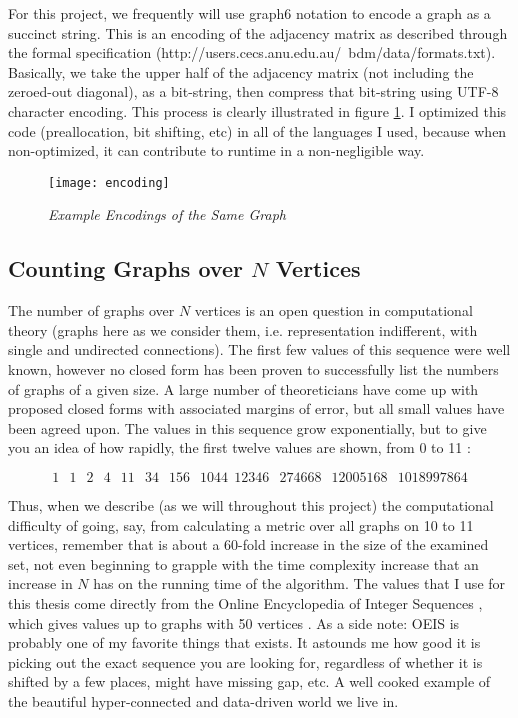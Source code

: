 For this project, we frequently will use graph6 notation to encode a graph as a succinct string.
This is an encoding of the adjacency matrix as described through the formal specification (http://users.cecs.anu.edu.au/~bdm/data/formats.txt).
Basically, we take the upper half of the adjacency matrix (not including the zeroed-out diagonal), as a bit-string, then compress that bit-string using UTF-8 character encoding.
This process is clearly illustrated in figure \ref{fig:encoding}.
I optimized this code (preallocation, bit shifting, etc) in all of the languages I used, because when non-optimized, it can contribute to runtime in a non-negligible way.

\begin{figure}[h]
\caption{\emph{Example Encodings of the Same Graph}}
\centering
\texttt{[image: encoding]}
\label{fig:encoding}
\end{figure}

\subsection{Counting Graphs over $N$ Vertices}

The number of graphs over $N$ vertices is an open question in computational theory (graphs here as we consider them, i.e. representation indifferent, with single and undirected connections).
The first few values of this sequence were well known, however no closed form has been proven to successfully list the numbers of graphs of a given size.
A large number of theoreticians have come up with proposed closed forms with associated margins of error, but all small values have been agreed upon.
The values in this sequence grow exponentially, but to give you an idea of how rapidly, the first twelve values are shown, from 0 to 11 \cite{oeis}:

$$1\,\; \;1\, \;\;2\, \;\;4\, \;\;11\, \;\;34\, \;\;156\, \;\;1044\,\; 12346\,\;\; 274668\, \;\;12005168\, \;\;1018997864$$

Thus, when we describe (as we will throughout this project) the computational difficulty of going, say, from calculating a metric over all graphs on 10 to 11 vertices, remember that is about a 60-fold increase in the size of the examined set, not even beginning to grapple with the time complexity increase that an increase in $N$ has on the running time of the algorithm.
The values that I use for this thesis come directly from the Online Encyclopedia of Integer Sequences \cite{oeis} , which gives values up to graphs with 50 vertices \cite{oeisbig}.
As a side note: OEIS is probably one of my favorite things that exists.
It astounds me how good it is picking out the exact sequence you are looking for, regardless of whether it is shifted by a few places, might have missing gap, etc.
A well cooked example of the beautiful hyper-connected and data-driven world we live in.

